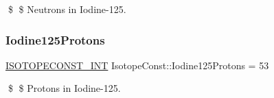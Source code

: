 \$ \$ Neutrons in Iodine-\/125. \mbox{\label{group___isotope_const-_iodine-_i125_gad9cf776e9efcf5bd2199c9e498a6568a}} 
\subsubsection{\texorpdfstring{Iodine125\+Protons}{Iodine125Protons}}
{\footnotesize\ttfamily \mbox{\hyperlink{group___isotope_const-_macros_ga5f18360b3e99483a35c32d789e62621c}{I\+S\+O\+T\+O\+P\+E\+C\+O\+N\+S\+T\+\_\+\+I\+NT}} Isotope\+Const\+::\+Iodine125\+Protons = 53}

\$ \$ Protons in Iodine-\/125. 